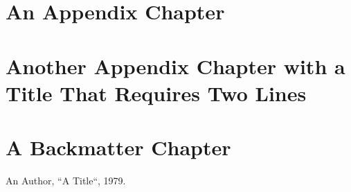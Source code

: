\documentclass[a4paper,11pt,oneside,showtrims]{alpenthesis}
\begin{document}
\chapter{An Appendix Chapter}
\lipsum[1-3]

\chapter{Another Appendix Chapter with a Title That Requires Two Lines}
\lipsum[4-6]

\backmatter
\chapter{A Backmatter Chapter}
\lipsum[7-9]

\begin{thebibliography}{1}
        An Author, ``A Title``, 1979.
\end{thebibliography}
\end{document}
